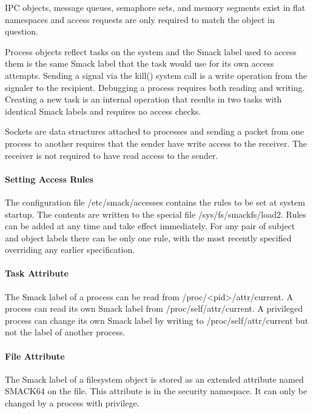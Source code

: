 \documentclass[a4paper,8pt,english]{sphinxmanual}
\begin{document}
IPC objects, message queues, semaphore sets, and memory segments exist in flat
namespaces and access requests are only required to match the object in
question.

Process objects reflect tasks on the system and the Smack label used to access
them is the same Smack label that the task would use for its own access
attempts. Sending a signal via the kill() system call is a write operation
from the signaler to the recipient. Debugging a process requires both reading
and writing. Creating a new task is an internal operation that results in two
tasks with identical Smack labels and requires no access checks.

Sockets are data structures attached to processes and sending a packet from
one process to another requires that the sender have write access to the
receiver. The receiver is not required to have read access to the sender.


\paragraph{Setting Access Rules}
\label{admin-guide/LSM/Smack:setting-access-rules}
The configuration file /etc/smack/accesses contains the rules to be set at
system startup. The contents are written to the special file
/sys/fs/smackfs/load2. Rules can be added at any time and take effect
immediately. For any pair of subject and object labels there can be only
one rule, with the most recently specified overriding any earlier
specification.


\paragraph{Task Attribute}
\label{admin-guide/LSM/Smack:task-attribute}
The Smack label of a process can be read from /proc/\textless{}pid\textgreater{}/attr/current. A
process can read its own Smack label from /proc/self/attr/current. A
privileged process can change its own Smack label by writing to
/proc/self/attr/current but not the label of another process.


\paragraph{File Attribute}
\label{admin-guide/LSM/Smack:file-attribute}
The Smack label of a filesystem object is stored as an extended attribute
named SMACK64 on the file. This attribute is in the security namespace. It can
only be changed by a process with privilege.
\end{document}
